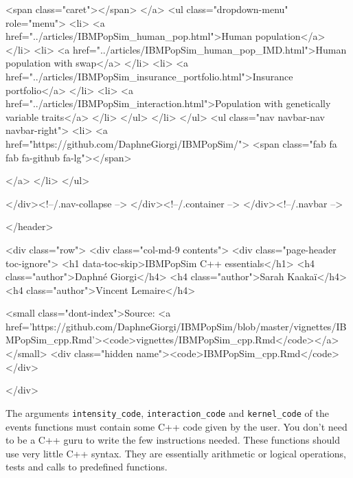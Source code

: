     <span class="caret"></span>
  </a>
  <ul class="dropdown-menu" role="menu">
    <li>
      <a href="../articles/IBMPopSim_human_pop.html">Human population</a>
    </li>
    <li>
      <a href="../articles/IBMPopSim_human_pop_IMD.html">Human population with swap</a>
    </li>
    <li>
      <a href="../articles/IBMPopSim_insurance_portfolio.html">Insurance portfolio</a>
    </li>
    <li>
      <a href="../articles/IBMPopSim_interaction.html">Population with genetically variable traits</a>
    </li>
  </ul>
</li>
      </ul>
      <ul class="nav navbar-nav navbar-right">
        <li>
  <a href="https://github.com/DaphneGiorgi/IBMPopSim/">
    <span class="fab fa fab fa-github fa-lg"></span>
     
  </a>
</li>
      </ul>
      
    </div><!--/.nav-collapse -->
  </div><!--/.container -->
</div><!--/.navbar -->

      

      </header>

\usepackage{booktabs}
\usepackage{longtable}
\usepackage{array}
\usepackage{multirow}
\usepackage{wrapfig}
\usepackage{float}
\usepackage{colortbl}
\usepackage{pdflscape}
\usepackage{tabu}
\usepackage{threeparttable}
\usepackage{threeparttablex}
\usepackage[normalem]{ulem}
\usepackage{makecell}
\usepackage{xcolor}

<div class="row">
  <div class="col-md-9 contents">
    <div class="page-header toc-ignore">
      <h1 data-toc-skip>IBMPopSim C++ essentials</h1>
                        <h4 class="author">Daphné Giorgi</h4>
                        <h4 class="author">Sarah Kaakaï</h4>
                        <h4 class="author">Vincent Lemaire</h4>
            
      
      <small class="dont-index">Source: <a href='https://github.com/DaphneGiorgi/IBMPopSim/blob/master/vignettes/IBMPopSim_cpp.Rmd'><code>vignettes/IBMPopSim_cpp.Rmd</code></a></small>
      <div class="hidden name"><code>IBMPopSim_cpp.Rmd</code></div>

    </div>

    
    
The arguments \texttt{intensity\_code}, \texttt{interaction\_code} and \texttt{kernel\_code} of the events functions must contain some C++ code given by the user. You don't need to be a C++ guru to write the few instructions needed. These functions should use very little C++ syntax. They are essentially arithmetic or logical operations, tests and calls to predefined functions.

